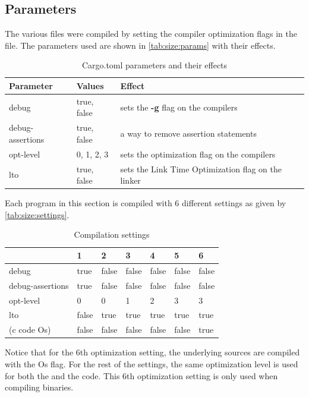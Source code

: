 \subsection{Parameters}
\label{sec:size:params}
The various files were compiled by setting the compiler optimization flags in the  file.
The parameters used are shown in \autoref{tab:size:params} with their effects.

\begin{table}[H]
  \centering
  \begin{tabular}{l|l|l}

    \textbf{Parameter} & \textbf{Values} & \textbf{Effect} \\
    \hline
    debug & true, false & sets the \textbf{-g} flag on the compilers  \\
    debug-assertions & true, false & a way to remove assertion statements \\
    opt-level & 0, 1, 2, 3 & sets the optimization flag on the compilers \\
    lto & true, false & sets the Link Time Optimization flag on the linker \\
    \hline
  \end{tabular}
  \caption{Cargo.toml parameters and their effects}
  \label{tab:size:params}
\end{table}

Each program in this section is compiled with 6 different settings as given by \autoref{tab:size:settings}.
\begin{table}[H]
  \centering
  \begin{tabular}{l|l|l|l|l|l|l}
    & \textbf{1} & \textbf{2} & \textbf{3} & \textbf{4} & \textbf{5} & \textbf{6} \\
    \hline
    debug            & true  & false & false & false & false & false \\
    debug-assertions & true  & false & false & false & false & false \\
    opt-level        & 0     & 0     & 1     & 2     & 3     & 3     \\
    lto              & false & true  & true  & true  & true  & true  \\
    (c code Os)      & false & false & false & false & false & true \\
    \hline
  \end{tabular}
  \caption{Compilation settings}
  \label{tab:size:settings}
\end{table}

Notice that for the 6th optimization setting, the underlying {\C} sources are compiled with the Os flag.
For the rest of the settings, the same optimization level is used for both the {\rust} and the {\C} code.
This 6th optimization setting is only used when compiling binaries.

